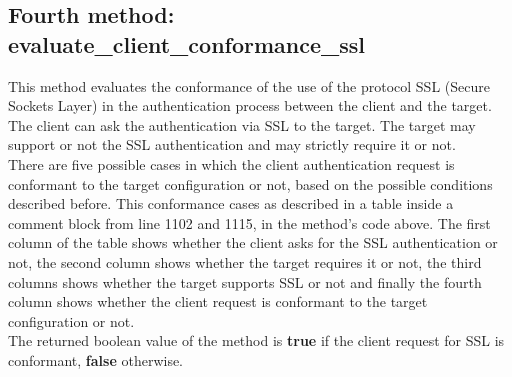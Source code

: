 \documentclass[\mainpath/main]{subfiles}
\begin{document}
\subsection{Fourth method: evaluate\_client\_conformance\_ssl}
\label{Assignment:AssignedMethods:FourthMethod}
This method evaluates the conformance of the use of the protocol SSL (Secure Sockets Layer) in the authentication process between the client and the target. The client can ask the authentication via SSL to the target. The target may support or not the SSL authentication and may strictly require it or not.\\
There are five possible cases in which the client authentication request is conformant to the target configuration or not, based on the possible conditions described before. This conformance cases as described in a table inside a comment block from line 1102 and 1115, in the method's code above. The first column of the table shows whether the client asks for the SSL authentication or not, the second column shows whether the target requires it or not, the third columns shows whether the target supports SSL or not and finally the fourth column shows whether the client request is conformant to the target configuration or not.\\
The returned boolean value of the method is \textbf{\color{javapurple} true} if the client request for SSL is conformant, \textbf{\color{javapurple} false} otherwise.
\end{document}
